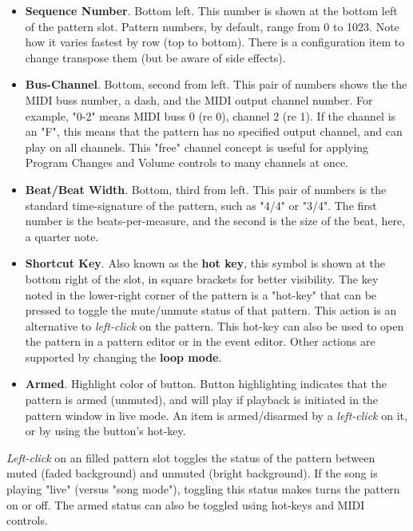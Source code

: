\begin{itemize}
         over.
      \item \textbf{Sequence Number}. Bottom left.
         This number is shown at the bottom left of the pattern slot.
         Pattern numbers, by default, range from 0 to 1023.
         Note how it varies fastest by row (top to bottom).
         There is a configuration item to change transpose them (but
         be aware of side effects).
      \item \textbf{Bus-Channel}. Bottom, second from left.
         This pair of numbers shows the the MIDI buss number, a dash, and
         the MIDI output channel number.
         For example, "0-2" means MIDI buss 0 (re 0), channel 2 (re 1).
         If the channel is an "F", this means that the pattern has no specified
         output channel, and can play on all channels.
         This "free" channel concept is useful for applying Program Changes and
         Volume controls to many channels at once.
      \item \textbf{Beat/Beat Width}. Bottom, third from left.
         This pair of numbers is the standard time-signature of the pattern,
         such as "4/4" or "3/4".  The first number is the beats-per-measure,
         and the second is the size of the beat, here, a quarter note.
      \item \textbf{Shortcut Key}.  Also known as the
         \textbf{hot key}, this symbol is shown at the bottom right of the
         slot, in square brackets for better visibility.
         The key noted in the lower-right corner of the pattern is a "hot-key"
         that can be pressed to toggle the mute/unmute status of that pattern.
         This action is an alternative to
         \textsl{left-click} on the pattern.
         This hot-key can also be used to open the pattern in a pattern editor
         or in the event editor.
         Other actions are supported by changing the 
         \textbf{loop mode}.
      \item \textbf{Armed}. Highlight color of button.
         Button highlighting indicates that the pattern is armed
         (unmuted), and will play if playback is initiated in the pattern
         window in live mode.
         An item is armed/disarmed by a
         \textsl{left-click} on it, or by using the
         button's hot-key.
   \end{itemize}

   \textsl{Left-click} on an filled pattern slot toggles the status of the
   pattern between muted (faded background) and unmuted (bright background).
   If the song is playing "live" (versus "song mode"), toggling this
   status makes turns the pattern on or off.  The armed status
   can also be toggled using hot-keys and MIDI controls.

